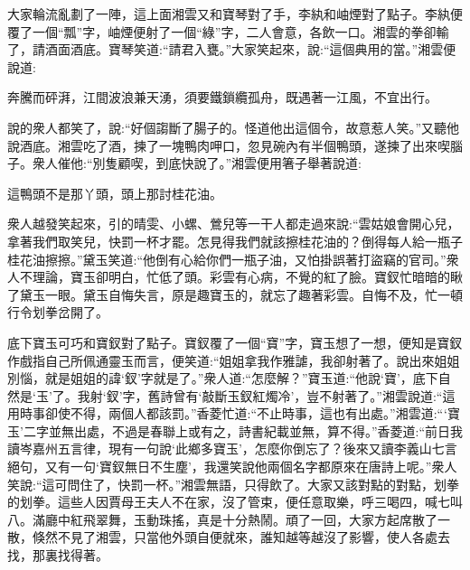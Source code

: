 \begin{parag}
    大家輪流亂劃了一陣，這上面湘雲又和寶琴對了手，李紈和岫煙對了點子。李紈便覆了一個“瓢”字，岫煙便射了一個“綠”字，二人會意，各飲一口。湘雲的拳卻輸了，請酒面酒底。寶琴笑道:“請君入甕。”大家笑起來，說:“這個典用的當。”湘雲便說道:
\end{parag}


\begin{poem}
    \begin{pl}奔騰而砰湃，江間波浪兼天湧，須要鐵鎖纜孤舟，既遇著一江風，不宜出行。\end{pl}

\end{poem}


\begin{parag}
    說的衆人都笑了，說:“好個謅斷了腸子的。怪道他出這個令，故意惹人笑。”又聽他說酒底。湘雲吃了酒，揀了一塊鴨肉呷口，忽見碗內有半個鴨頭，遂揀了出來喫腦子。衆人催他:“別隻顧喫，到底快說了。”湘雲便用箸子舉著說道:
\end{parag}


\begin{poem}
    \begin{pl}這鴨頭不是那丫頭，頭上那討桂花油。\end{pl}
\end{poem}


\begin{parag}
    衆人越發笑起來，引的晴雯、小螺、鶯兒等一干人都走過來說:“雲姑娘會開心兒，拿著我們取笑兒，快罰一杯才罷。怎見得我們就該擦桂花油的？倒得每人給一瓶子桂花油擦擦。”黛玉笑道:“他倒有心給你們一瓶子油，又怕掛誤著打盜竊的官司。”衆人不理論，寶玉卻明白，忙低了頭。彩雲有心病，不覺的紅了臉。寶釵忙暗暗的瞅了黛玉一眼。黛玉自悔失言，原是趣寶玉的，就忘了趣著彩雲。自悔不及，忙一頓行令划拳岔開了。
\end{parag}


\begin{parag}
    底下寶玉可巧和寶釵對了點子。寶釵覆了一個“寶”字，寶玉想了一想，便知是寶釵作戲指自己所佩通靈玉而言，便笑道:“姐姐拿我作雅謔，我卻射著了。說出來姐姐別惱，就是姐姐的諱‘釵’字就是了。”衆人道:“怎麼解？”寶玉道:“他說‘寶’，底下自然是‘玉’了。我射‘釵’字，舊詩曾有‘敲斷玉釵紅燭冷’，豈不射著了。”湘雲說道:“這用時事卻使不得，兩個人都該罰。”香菱忙道:“不止時事，這也有出處。”湘雲道:“‘寶玉’二字並無出處，不過是春聯上或有之，詩書紀載並無，算不得。”香菱道:“前日我讀岑嘉州五言律，現有一句說‘此鄉多寶玉’，怎麼你倒忘了？後來又讀李義山七言絕句，又有一句‘寶釵無日不生塵’，我還笑說他兩個名字都原來在唐詩上呢。”衆人笑說:“這可問住了，快罰一杯。”湘雲無語，只得飲了。大家又該對點的對點，划拳的划拳。這些人因賈母王夫人不在家，沒了管束，便任意取樂，呼三喝四，喊七叫八。滿廳中紅飛翠舞，玉動珠搖，真是十分熱鬧。頑了一回，大家方起席散了一散，倏然不見了湘雲，只當他外頭自便就來，誰知越等越沒了影響，使人各處去找，那裏找得著。
\end{parag}


